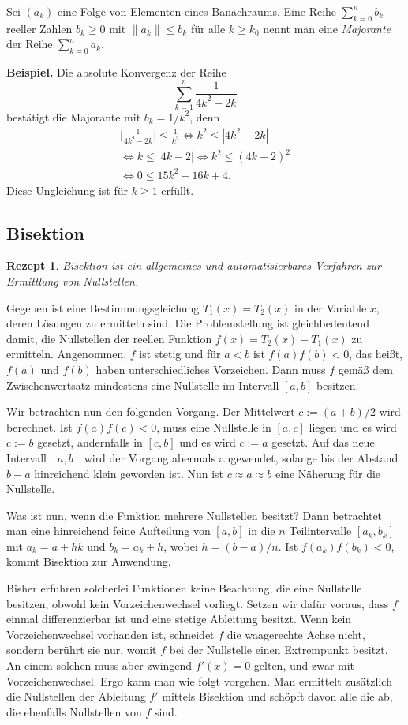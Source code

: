 \documentclass[a4paper,10pt,fleqn,twocolumn,twoside,dvipdfmx]{scrartcl}
\theoremstyle{rmbox}
\newtheorem{Rezept}{Rezept}[section]
\newcommand{\strong}[1]{\textsf{\textbf{#1}}}
\begin{document}
\noindent
Sei $(a_k)$ eine Folge von Elementen eines Banachraums.
Eine Reihe $\sum_{k=0}^n b_k$ reeller Zahlen $b_k\ge 0$ mit
$\|a_k\|\le b_k$ für alle $k\ge k_0$ nennt man eine \emph{Majorante}
der Reihe $\sum_{k=0}^n a_k$.

\strong{Beispiel.} Die absolute Konvergenz der Reihe
\[\sum_{k=1}^n\frac{1}{4k^2-2k}\]
bestätigt die Majorante mit $b_k=1/k^2$, denn
\begin{gather*}
\Big|\frac{1}{4k^2-2k}\Big| \le \frac{1}{k^2}\iff k^2\le |4k^2-2k|\\
\iff k\le |4k-2| \iff k^2 \le (4k-2)^2\\
\iff 0\le 15k^2-16k+4.
\end{gather*}
Diese Ungleichung ist für $k\ge 1$ erfüllt.

\newpage
\subsection{Bisektion}

\begin{Rezept}
Bisektion ist ein allgemeines und automatisierbares
Verfahren zur Ermittlung von Nullstellen.
\end{Rezept}

\noindent
Gegeben ist eine Bestimmungsgleichung $T_1(x)=T_2(x)$ in der
Variable $x$, deren Lösungen zu ermitteln sind. Die Problemstellung
ist gleichbedeutend damit, die Nullstellen der reellen Funktion
$f(x)=T_2(x)-T_1(x)$ zu ermitteln. Angenommen, $f$ ist stetig
und für $a<b$ ist $f(a)f(b)<0$, das heißt, $f(a)$ und $f(b)$ haben
unterschiedliches Vorzeichen. Dann muss $f$ gemäß dem Zwischenwertsatz
mindestens eine Nullstelle im Intervall $[a,b]$ besitzen.

Wir betrachten nun den folgenden Vorgang. Der Mittelwert $c := (a+b)/2$
wird berechnet. Ist $f(a)f(c)<0$, muss eine Nullstelle in $[a,c]$
liegen und es wird $c:=b$ gesetzt, andernfalls in $[c,b]$ und es
wird $c:=a$ gesetzt. Auf das neue Intervall $[a,b]$ wird der Vorgang
abermals angewendet, solange bis der Abstand $b-a$ hinreichend klein
geworden ist. Nun ist $c\approx a\approx b$ eine Näherung für die
Nullstelle.

Was ist nun, wenn die Funktion mehrere Nullstellen besitzt?
Dann betrachtet man eine hinreichend feine Aufteilung von $[a,b]$ in
die $n$ Teilintervalle $[a_k,b_k]$ mit $a_k=a+hk$ und $b_k=a_k+h$, wobei
$h=(b-a)/n$. Ist $f(a_k)f(b_k)<0$, kommt Bisektion zur
Anwendung.

Bisher erfuhren solcherlei Funktionen keine Beachtung, die eine
Nullstelle besitzen, obwohl kein Vorzeichenwechsel vorliegt.
Setzen wir dafür voraus, dass $f$ einmal differenzierbar ist und
eine stetige Ableitung besitzt. Wenn kein Vorzeichenwechsel
vorhanden ist, schneidet $f$ die waagerechte Achse nicht,
sondern berührt sie nur, womit $f$ bei der Nullstelle einen
Extrempunkt besitzt. An einem solchen muss aber zwingend $f'(x)=0$
gelten, und zwar mit Vorzeichenwechsel. Ergo kann man wie folgt
vorgehen. Man ermittelt zusätzlich die Nullstellen der Ableitung $f'$
mittels Bisektion und schöpft davon alle die ab, die ebenfalls
Nullstellen von $f$ sind.
\end{document}
